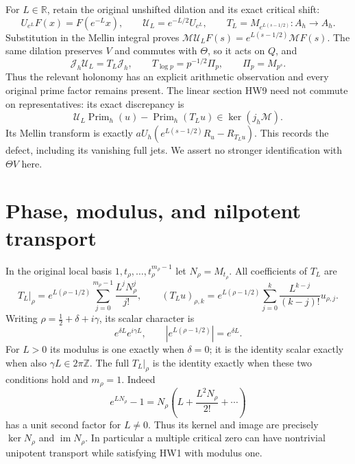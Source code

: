 \documentclass[11pt]{article}
\newcommand{\R}{\mathbb R}
\newcommand{\Z}{\mathbb Z}
\newcommand{\M}{\mathcal M}
\newcommand{\im}{\operatorname{im}}
\begin{document}
For \(L\in\R\), retain the original unshifted dilation and its
exact critical shift:
\[
 U_{e^L}F(x)=F(e^{-L}x),\qquad
 \mathcal U_L=e^{-L/2}U_{e^L},\qquad
 T_L=M_{e^{L(s-1/2)}}:A_h\longrightarrow A_h.
 \tag{HW10}
\]
Substitution in the Mellin integral proves
\(\M\mathcal U_LF(s)=e^{L(s-1/2)}\M F(s)\).
The same dilation preserves \(V\) and commutes with \(\Theta\),
so it acts on \(Q\), and
\[
 \mathcal J_h\mathcal U_L=T_L\mathcal J_h,\qquad
 T_{\log p}=p^{-1/2}\Pi_p,\qquad \Pi_p=M_{p^s}.
 \tag{HW11}\label{hw:intertwine}
\]
Thus the relevant holonomy has an explicit arithmetic observation
and every original prime factor remains present. The linear section
HW9 need not commute on representatives: its exact discrepancy is
\[
 \mathcal U_L\operatorname{Prim}_h(u)
       -\operatorname{Prim}_h(T_Lu)\in\ker(j_h\M).
 \tag{HW12}
\]
Its Mellin transform is exactly
\(aU_h(e^{L(s-1/2)}R_u-R_{T_Lu})\).
This records the defect, including its vanishing full jets.
We assert no stronger identification with \(\Theta V\) here.

\section{Phase, modulus, and nilpotent transport}

In the original local basis \(1,t_\rho,\ldots,t_\rho^{m_\rho-1}\)
let \(N_\rho=M_{t_\rho}\). All coefficients of \(T_L\) are
\[
 T_L|_\rho
 =e^{L(\rho-1/2)}
       \sum_{j=0}^{m_\rho-1}\frac{L^jN_\rho^j}{j!},\qquad
 (T_Lu)_{\rho,k}
 =e^{L(\rho-1/2)}
       \sum_{j=0}^k\frac{L^{k-j}}{(k-j)!}u_{\rho,j}.
 \tag{HW13}\label{hw:fullmonodromy}
\]
Writing \(\rho=\tfrac12+\delta+i\gamma\), its scalar character is
\[
 e^{\delta L}e^{i\gamma L},\qquad
 \left|e^{L(\rho-1/2)}\right|=e^{\delta L}.
 \tag{HW14}
\]
For \(L>0\) its modulus is one exactly when \(\delta=0\);
it is the identity scalar exactly when also
\(\gamma L\in2\pi\Z\). The full \(T_L|_\rho\) is the identity
exactly when these two conditions hold and \(m_\rho=1\).
Indeed
\[
 e^{LN_\rho}-1=N_\rho
  \left(L+\frac{L^2N_\rho}{2!}+\cdots\right)
 \tag{HW15}
\]
has a unit second factor for \(L\ne0\). Thus its kernel and image
are precisely \(\ker N_\rho\) and \(\im N_\rho\).
In particular a multiple critical zero can have nontrivial
unipotent transport while satisfying HW1 with modulus one.
\end{document}
